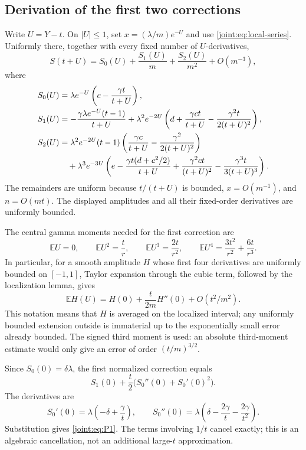 \documentclass[11pt,a4paper]{article}
\numberwithin{equation}{section}
\theoremstyle{plain}
\theoremstyle{definition}
\theoremstyle{remark}
\begin{document}
\subsection{Derivation of the first two corrections}

Write $U=Y-t$. On $|U|\leq1$, set $x=(\lambda/m)e^{-U}$ and use
\eqref{joint:eq:local-series}. Uniformly there, together with every
fixed number of $U$-derivatives,
\begin{equation}\label{joint:eq:S-expansion}
 S(t+U)=S_0(U)+\frac{S_1(U)}m+\frac{S_2(U)}{m^2}+O(m^{-3}),
\end{equation}
where
\begin{align}
 S_0(U)&=\lambda e^{-U}
       \left(c-\frac{\gamma t}{t+U}\right),\notag\\
 S_1(U)&=-\frac{\gamma\lambda e^{-U}(t-1)}{t+U}
  +\lambda^2e^{-2U}
       \left(d+\frac{\gamma ct}{t+U}
                   -\frac{\gamma^2t}{2(t+U)^2}\right),\notag\\
 S_2(U)&=\lambda^2e^{-2U}(t-1)
       \left(\frac{\gamma c}{t+U}
                    -\frac{\gamma^2}{2(t+U)^2}\right)\notag\\
 &\quad+\lambda^3e^{-3U}
       \left(e-\frac{\gamma t(d+c^2/2)}{t+U}
          +\frac{\gamma^2ct}{(t+U)^2}
          -\frac{\gamma^3t}{3(t+U)^3}\right).
 \label{joint:eq:S012}
\end{align}
The remainders are uniform because $t/(t+U)$ is bounded,
$x=O(m^{-1})$, and $n=O(mt)$. The displayed amplitudes and all their
fixed-order derivatives are uniformly bounded.

The central gamma moments needed for the first correction are
\[
 \mathbb EU=0,\qquad
 \mathbb EU^2=\frac tr,\qquad
 \mathbb EU^3=\frac{2t}{r^2},\qquad
 \mathbb EU^4=\frac{3t^2}{r^2}+\frac{6t}{r^3}.
\]
In particular, for a smooth amplitude $H$ whose first four derivatives
are uniformly bounded on $[-1,1]$, Taylor expansion through the cubic
term, followed by the localization lemma, gives
\[
 \mathbb EH(U)=H(0)+\frac{t}{2m}H''(0)
                        +O(t^2/m^2).
\]
This notation means that $H$ is averaged on the localized interval;
any uniformly bounded extension outside is immaterial up to the
exponentially small error already bounded. The signed third moment is used: an absolute
third-moment estimate would only give an error of order
$(t/m)^{3/2}$.

Since $S_0(0)=\delta\lambda$, the first normalized correction equals
\[
 S_1(0)+\frac t2\bigl(S_0''(0)+S_0'(0)^2\bigr).
\]
The derivatives are
\[
 S_0'(0)=\lambda\left(-\delta+\frac\gamma t\right),\qquad
 S_0''(0)=\lambda\left(\delta-\frac{2\gamma}t
                                   -\frac{2\gamma}{t^2}\right).
\]
Substitution gives \eqref{joint:eq:P1}. The terms involving $1/t$
cancel exactly; this is an algebraic cancellation, not an additional
large-$t$ approximation.
\end{document}

